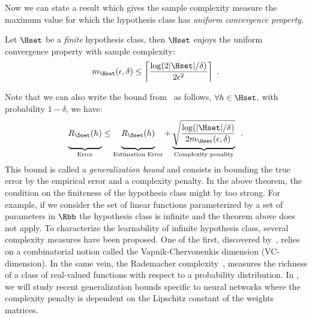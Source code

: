 Now we can state a result which gives the sample complexity measure the maximum value for which the hypothesis class has \emph{uniform convergence property}.
\begin{theorem} \label{theorem:ch2-sample_complexity_bound}
  Let $\Hset$ be a \emph{finite} hypothesis class, then $\Hset$ enjoys the uniform convergence property with sample complexity:
  \begin{equation}
      m_\Hset(\epsilon, \delta) \leq \left\lceil \frac{\log(2 |\Hset|	/ \delta)}{2 \epsilon^2} \right\rceil \enspace.
  \end{equation}
  \removespace
\end{theorem}
\noindent
Note that we can also write the bound from~ as follows, $\forall h \in \Hset$, with probability $1 - \delta$, we have:
\begin{equation}
  \underbrace{\vphantom{\sqrt{\frac{\log(|\Hset|/\delta)}{2 m_\Hset(\epsilon, \delta)}}} R_\Dset(h)}_{\text{Error}} \leq \underbrace{\vphantom{\sqrt{\frac{\log(|\Hset|/\delta)}{2 m_\Hset(\epsilon, \delta)}}} R_\Sset(h)}_{\text{Estimation Error}} + \underbrace{\sqrt{\frac{\log(|\Hset|/\delta)}{2 m_\Hset(\epsilon, \delta)}}}_{\text{Complexity penality}} \enspace.
\end{equation}
This bound is called a \emph{generalization bound} and consists in bounding the true error by the empirical error and a complexity penalty.
In the above theorem, the condition on the finiteness of the hypothesis class might by too strong.
For example, if we consider the set of linear functions parameterized by a set of parameters in $\Rbb$ the hypothesis class is infinite and the theorem above does not apply.
To characterize the learnability of infinite hypothesis class, several complexity measures have been proposed.
One of the first, discovered by~\citet{vapnik2015uniform}, relies on a combinatorial notion called the Vapnik-Chervonenkis dimension (VC-dimension).
In the same vein, the Rademacher complexity~\cite{koltchinskii2000rademacher}, measures the richness of a class of real-valued functions with respect to a probability distribution.
In , we will study recent generalization bounds specific to neural networks where the complexity penalty is dependent on the Lipschitz constant of the weights matrices.


